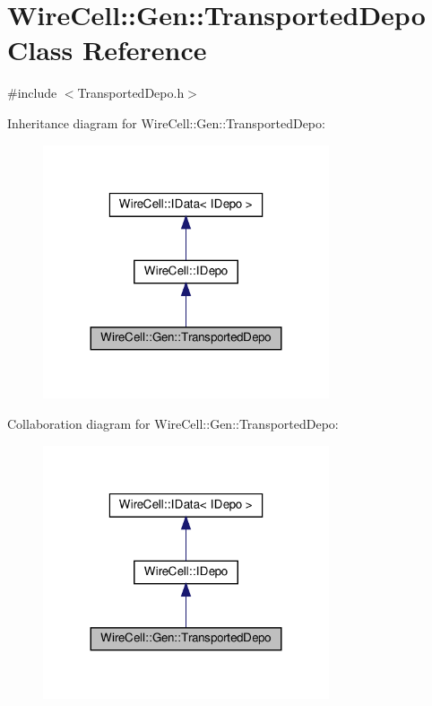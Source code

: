 \hypertarget{class_wire_cell_1_1_gen_1_1_transported_depo}{}\section{Wire\+Cell\+:\+:Gen\+:\+:Transported\+Depo Class Reference}
\label{class_wire_cell_1_1_gen_1_1_transported_depo}


{\ttfamily \#include $<$Transported\+Depo.\+h$>$}



Inheritance diagram for Wire\+Cell\+:\+:Gen\+:\+:Transported\+Depo\+:
\nopagebreak
\begin{figure}[H]
\begin{center}
\leavevmode
\includegraphics[width=239pt]{class_wire_cell_1_1_gen_1_1_transported_depo__inherit__graph}
\end{center}
\end{figure}


Collaboration diagram for Wire\+Cell\+:\+:Gen\+:\+:Transported\+Depo\+:
\nopagebreak
\begin{figure}[H]
\begin{center}
\leavevmode
\includegraphics[width=239pt]{class_wire_cell_1_1_gen_1_1_transported_depo__coll__graph}
\end{center}
\end{figure}
